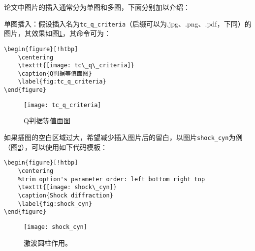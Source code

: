 论文中图片的插入通常分为单图和多图，下面分别加以介绍：

单图插入：假设插入名为\verb|tc_q_criteria|（后缀可以为.jpg、.png、.pdf，下同）的图片，其效果如图\ref{fig:tc_q_criteria}，其命令可为：
\begin{verbatim}
\begin{figure}[!htbp]
    \centering
    \texttt{[image: tc\_q\_criteria]}
    \caption{Q判据等值面图}
    \label{fig:tc_q_criteria}
\end{figure}
\end{verbatim}
\begin{figure}[!htbp]
    \centering
    \texttt{[image: tc\_q\_criteria]}
    \caption{Q判据等值面图}
    \label{fig:tc_q_criteria}
\end{figure}

如果插图的空白区域过大，希望减少插入图片后的留白，以图片\verb|shock_cyn|为例（图\ref{fig:shock_cyn}），可以使用如下代码模板：
\begin{verbatim}
\begin{figure}[!htbp]
    \centering
    %trim option's parameter order: left bottom right top
    \texttt{[image: shock\_cyn]}
    \caption{Shock diffraction}
    \label{fig:shock_cyn}
\end{figure}
\end{verbatim}
\begin{figure}[!htbp]
    \centering
    \texttt{[image: shock\_cyn]}
    \caption{激波圆柱作用。}
    \label{fig:shock_cyn}
\end{figure}

